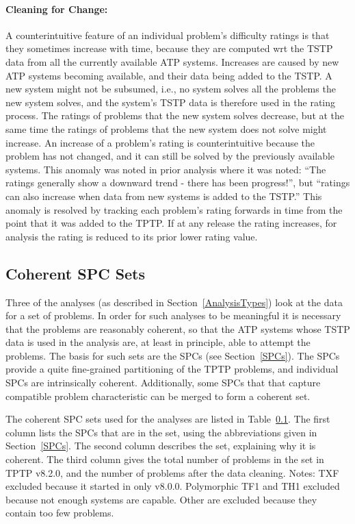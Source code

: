 \documentclass[runningheads]{llncs}
\begin{document}
\paragraph{Cleaning for Change:}
A counterintuitive feature of an individual problem's difficulty ratings is that they sometimes 
increase with time, because they are computed wrt the TSTP data from all the currently available
ATP systems.
Increases are caused by new ATP systems becoming available, and their data being added to the TSTP.
A new system might not be subsumed, i.e., no system solves all the problems the new system solves, 
and the system's TSTP data is therefore used in the rating process.
The ratings of problems that the new system solves decrease, but at the same time the ratings of
problems that the new system does not solve might increase.
An increase of a problem's rating is counterintuitive because the problem has not changed, and 
it can still be solved by the previously available systems.
This anomaly was noted in prior analysis \cite{Sut17} where it was noted: ``The ratings generally 
show a downward trend - there has been progress!'', but ``ratings can also increase when data 
from new systems is added to the TSTP.''
This anomaly is resolved by tracking each problem's rating forwards in time from the point 
that it was added to the TPTP.
If at any release the rating increases, for analysis the rating is reduced to its prior
lower rating value.

\subsection{Coherent SPC Sets}
\label{SPCSets}

Three of the analyses (as described in Section~\ref{AnalysisTypes}) look at the data for a set
of problems.
In order for such analyses to be meaningful it is necessary that the problems are reasonably
coherent, so that the ATP systems whose TSTP data is used in the analysis are, at least
in principle, able to attempt the problems.
The basis for such sets are the SPCs (see Section~\ref{SPCs}).
The SPCs provide a quite fine-grained partitioning of the TPTP problems, and individual SPCs
are intrinsically coherent.
Additionally, some SPCs that that capture compatible problem characteristic can be merged
to form a coherent set.

The coherent SPC sets used for the analyses are listed in Table~\ref{SPCSets}.
The first column lists the SPCs that are in the set, using the abbreviations given in 
Section~\ref{SPCs}.
The second column describes the set, explaining why it is coherent.
The third column gives the total number of problems in the set in TPTP v8.2.0, and the
number of problems after the data cleaning.
Notes: TXF excluded because it started in only v8.0.0.
Polymorphic TF1 and TH1 excluded because not enough systems are capable.
Other are excluded because they contain too few problems.
\end{document}
